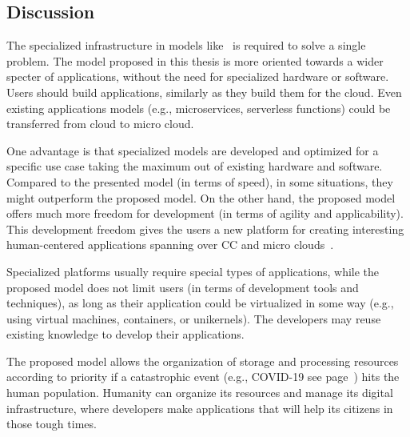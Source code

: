 \subsection{Discussion}
%
The specialized infrastructure in models like~\cite{BaccarelliNSSA17, GuoRG20, JeonK19, BCAK19, ChiariniRAMG13} is required to solve a single problem. The model proposed in this thesis is more oriented towards a wider specter of applications, without the need for specialized hardware or software. Users should build applications, similarly as they build them for the cloud. Even existing applications models (e.g., microservices, serverless functions) could be transferred from cloud to micro cloud.

One advantage is that specialized models are developed and optimized for a specific use case taking the maximum out of existing hardware and software. Compared to the presented model (in terms of speed), in some situations, they might outperform the proposed model. On the other hand, the proposed model offers much more freedom for development (in terms of agility and applicability). This development freedom gives the users a new platform for creating interesting human-centered applications spanning over CC and micro clouds~\cite{VillariCF17}.

Specialized platforms usually require special types of applications, while the proposed model does not limit users (in terms of development tools and techniques), as long as their application could be virtualized in some way (e.g., using virtual machines, containers, or unikernels). The developers may reuse existing knowledge to develop their applications.

The proposed model allows the organization of storage and processing resources according to priority if a catastrophic event (e.g., COVID-19 see page~\pageref{sec:covid_example}) hits the human population. Humanity can organize its resources and manage its digital infrastructure, where developers make applications that will help its citizens in those tough times.
%
%
